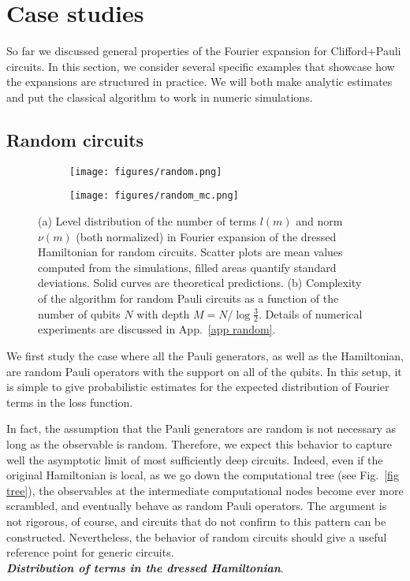 \documentclass[twocolumn, amsfonts, amssymb, aps, nofootinbib]{revtex4-2}
\newcommand{\CP}{Clifford+Pauli}
\begin{document}
\section{Case studies} \label{sec cases}
So far we discussed general properties of the Fourier expansion for \CP{} circuits. In this section, we consider several specific examples that showcase how the expansions are structured in practice. We will both make analytic estimates and put the classical algorithm to work in numeric simulations.
\subsection{Random circuits}
\begin{figure}
	\begin{subfigure}{0.4\textwidth}
		\texttt{[image: figures/random.png]}
		\caption{}
		\label{fig random nodes}
	\end{subfigure}	

	\begin{subfigure}{0.4\textwidth}
		\texttt{[image: figures/random\_mc.png]}
		\caption{}		
		\label{fig random scaling}
	\end{subfigure}
	
	\caption{(a) Level distribution of the number of terms $l(m)$ and norm $\nu(m)$ (both normalized) in Fourier expansion of the dressed Hamiltonian for random circuits. Scatter plots are mean values computed from the simulations, filled areas quantify standard deviations. Solid curves are theoretical predictions. (b) Complexity of the algorithm for random Pauli circuits as a function of the number of qubits $N$ with depth $M=N/\log\frac32$. Details of numerical experiments are discussed in App.~\ref{app random}.}
	\label{fig random}
\end{figure}
We first study the case where all the Pauli generators, as well as the Hamiltonian, are random Pauli operators with the support on all of the qubits. In this setup, it is simple to give probabilistic estimates for the expected distribution of Fourier terms in the loss function. 

In fact, the assumption that the Pauli generators are random is not necessary as long as the observable is random. Therefore, we expect this behavior to capture well the asymptotic limit of most sufficiently deep circuits. Indeed, even if the original Hamiltonian is local, as we go down the computational tree (see Fig.~\ref{fig tree}), the observables at the intermediate computational nodes become ever more scrambled, and eventually behave as random Pauli operators. The argument is not rigorous, of course, and circuits that do not confirm to this pattern can be constructed. Nevertheless, the behavior of random circuits should give a useful reference point for generic circuits.\\[4pt]
\textbf{\textit{Distribution of terms in the dressed Hamiltonian}}. 
\end{document}
